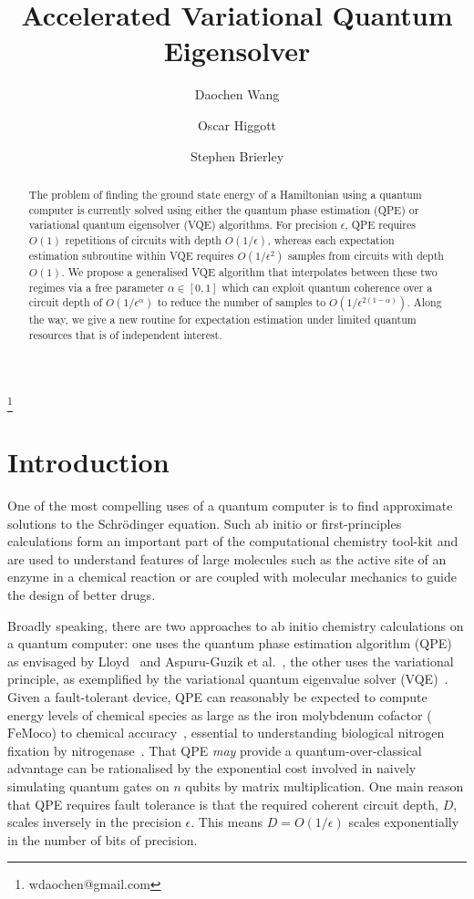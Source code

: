 \documentclass[twocolumn,
 reprint,
 amsmath,amssymb,
 aps,
 floatfix,
superscriptaddress
]{revtex4-1}
\begin{document}
\title{Accelerated Variational Quantum Eigensolver}

\author{Daochen Wang}\thanks{wdaochen@gmail.com}
\author{Oscar Higgott}
\author{Stephen Brierley}

\begin{abstract}
The problem of finding the ground state energy of a Hamiltonian
using a quantum computer is currently solved using either the quantum phase estimation (QPE) or variational quantum eigensolver (VQE) algorithms.
For precision $\epsilon$, QPE requires $O(1)$ repetitions of circuits
with depth $O(1/\epsilon)$, whereas each expectation estimation subroutine
within VQE requires $O(1/\epsilon^{2})$ samples from circuits with depth $O(1)$. We propose a generalised VQE algorithm that interpolates between these two regimes via a free parameter $\alpha\in[0,1]$ which can exploit quantum coherence over a circuit depth of  $O(1/\epsilon^{\alpha})$ to reduce the number of samples to $O(1/\epsilon^{2(1-\alpha)})$. Along the way, we  give a new routine for expectation estimation under limited quantum resources that is of independent interest.
\end{abstract}
\maketitle

\section{\label{sec: Introduction} Introduction}

One of the most compelling uses of a quantum computer is to find approximate
solutions to the Schr\"odinger equation. Such ab initio or first-principles
calculations form an important part of the computational chemistry tool-kit and are used to understand features of large molecules
such as the active site of an enzyme in a chemical reaction or are
coupled with molecular mechanics to guide the design of better drugs.

Broadly speaking, there are two approaches to ab initio chemistry
calculations on a quantum computer: one uses the quantum phase estimation
algorithm (QPE) as envisaged by Lloyd~\cite{Lloyd1073} and Aspuru-Guzik et al.~\cite{Aspuru-Guzik2005}, the other uses the variational principle, as exemplified by the variational quantum eigenvalue solver (VQE)~\cite{Peruzzo2014}. Given a fault-tolerant device, QPE can reasonably be
expected to compute energy levels of chemical species as large as the iron
molybdenum cofactor ($\text{FeMoco}$) to chemical accuracy~\cite{Reiher2017}, essential to
understanding biological nitrogen fixation by nitrogenase~\cite{Reiher2017,Hoffman2014}. That QPE \textit{may} provide a quantum-over-classical advantage can be rationalised by the exponential cost involved in naively simulating quantum gates on $n$ qubits by matrix multiplication. One main reason that QPE requires fault tolerance is that the required coherent circuit depth, $D$, scales inversely in the precision $\epsilon$. This means $D=O(1/\epsilon)$ scales exponentially in the number of bits of precision.
\end{document}
